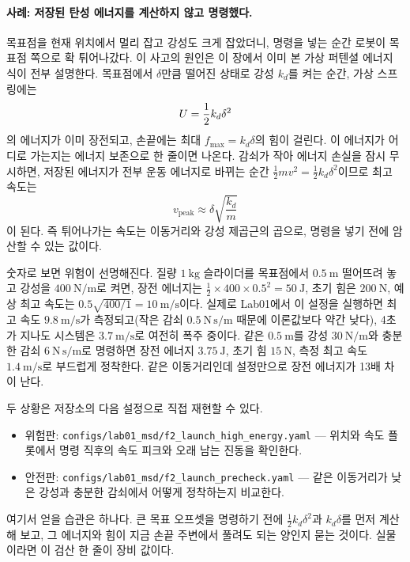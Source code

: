 \paragraph{사례: 저장된 탄성 에너지를 계산하지 않고 명령했다.}
목표점을 현재 위치에서 멀리 잡고 강성도 크게 잡았더니, 명령을 넣는 순간 로봇이 목표점 쪽으로 확 튀어나갔다.
이 사고의 원인은 이 장에서 이미 본 가상 퍼텐셜 에너지 식이 전부 설명한다.
목표점에서 $\delta$만큼 떨어진 상태로 강성 $k_d$를 켜는 순간, 가상 스프링에는
\[
  U=\frac{1}{2}k_d\delta^2
\vmark{fail-f2-energy-precheck}%
\]
의 에너지가 이미 장전되고, 손끝에는 최대 $f_{\max}=k_d\delta$의 힘이 걸린다.
이 에너지가 어디로 가는지는 에너지 보존으로 한 줄이면 나온다.
감쇠가 작아 에너지 손실을 잠시 무시하면, 저장된 에너지가 전부 운동 에너지로 바뀌는 순간 $\frac{1}{2}mv^2=\frac{1}{2}k_d\delta^2$이므로 최고 속도는
\[
  v_{\mathrm{peak}}
  \approx
  \delta\sqrt{\frac{k_d}{m}}
\]
이 된다.
즉 튀어나가는 속도는 이동거리와 강성 제곱근의 곱으로, 명령을 넣기 전에 암산할 수 있는 값이다.

숫자로 보면 위험이 선명해진다.
질량 $1~\mathrm{kg}$ 슬라이더를 목표점에서 $0.5~\mathrm{m}$ 떨어뜨려 놓고 강성을 $400~\mathrm{N/m}$로 켜면, 장전 에너지는 $\frac{1}{2}\times400\times0.5^2=50~\mathrm{J}$, 초기 힘은 $200~\mathrm{N}$, 예상 최고 속도는 $0.5\sqrt{400/1}=10~\mathrm{m/s}$이다.
실제로 Lab01에서 이 설정을 실행하면 최고 속도 $9.8~\mathrm{m/s}$가 측정되고(작은 감쇠 $0.5~\mathrm{N\,s/m}$ 때문에 이론값보다 약간 낮다), 4초가 지나도 시스템은 $3.7~\mathrm{m/s}$로 여전히 폭주 중이다.
같은 $0.5~\mathrm{m}$를 강성 $30~\mathrm{N/m}$와 충분한 감쇠 $6~\mathrm{N\,s/m}$로 명령하면 장전 에너지 $3.75~\mathrm{J}$, 초기 힘 $15~\mathrm{N}$, 측정 최고 속도 $1.4~\mathrm{m/s}$로 부드럽게 정착한다.
같은 이동거리인데 설정만으로 장전 에너지가 13배 차이 난다.
%

두 상황은 저장소의 다음 설정으로 직접 재현할 수 있다.
\begin{itemize}
  \item 위험판: \texttt{configs/lab01\_msd/f2\_launch\_high\_energy.yaml} --- 위치와 속도 플롯에서 명령 직후의 속도 피크와 오래 남는 진동을 확인한다.
  \item 안전판: \texttt{configs/lab01\_msd/f2\_launch\_precheck.yaml} --- 같은 이동거리가 낮은 강성과 충분한 감쇠에서 어떻게 정착하는지 비교한다.
\end{itemize}
%
여기서 얻을 습관은 하나다.
큰 목표 오프셋을 명령하기 전에 $\frac{1}{2}k_d\delta^2$과 $k_d\delta$를 먼저 계산해 보고, 그 에너지와 힘이 지금 손끝 주변에서 풀려도 되는 양인지 묻는 것이다.
실물이라면 이 검산 한 줄이 장비 값이다.

